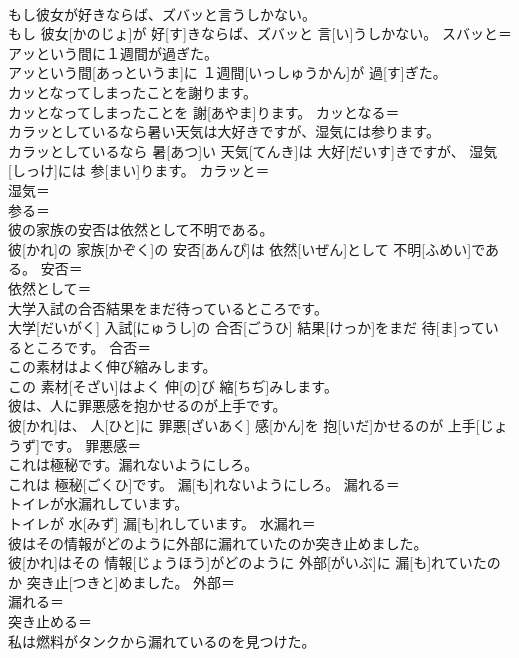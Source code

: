 \documentclass[8pt]{extreport}
\begin{document}
\begin{CJK}{UTF8}{min}
\\	もし彼女が好きならば、ズバッと言うしかない。	
\\	もし 彼女[かのじょ]が 好[す]きならば、ズバッと 言[い]うしかない。	スバッと＝ 
\\	アッという間に１週間が過ぎた。	
\\	アッという間[あっというま]に １週間[いっしゅうかん]が 過[す]ぎた。	
\\	カッとなってしまったことを謝ります。	
\\	カッとなってしまったことを 謝[あやま]ります。	カッとなる＝ 
\\	カラッとしているなら暑い天気は大好きですが、湿気には参ります。	
\\	カラッとしているなら 暑[あつ]い 天気[てんき]は 大好[だいす]きですが、 湿気[しっけ]には 参[まい]ります。	カラッと＝ 
\\	湿気＝ 
\\	参る＝ 
\\	彼の家族の安否は依然として不明である。	
\\	彼[かれ]の 家族[かぞく]の 安否[あんぴ]は 依然[いぜん]として 不明[ふめい]である。	安否＝ 
\\	依然として＝ 
\\	大学入試の合否結果をまだ待っているところです。	
\\	大学[だいがく] 入試[にゅうし]の 合否[ごうひ] 結果[けっか]をまだ 待[ま]っているところです。	合否＝ 
\\	この素材はよく伸び縮みします。	
\\	この 素材[そざい]はよく 伸[の]び 縮[ちぢ]みします。	
\\	彼は、人に罪悪感を抱かせるのが上手です。	
\\	彼[かれ]は、 人[ひと]に 罪悪[ざいあく] 感[かん]を 抱[いだ]かせるのが 上手[じょうず]です。	罪悪感＝ 
\\	これは極秘です。漏れないようにしろ。	
\\	これは 極秘[ごくひ]です。 漏[も]れないようにしろ。	漏れる＝ 
\\	トイレが水漏れしています。	
\\	トイレが 水[みず] 漏[も]れしています。	水漏れ＝ 
\\	彼はその情報がどのように外部に漏れていたのか突き止めました。	
\\	彼[かれ]はその 情報[じょうほう]がどのように 外部[がいぶ]に 漏[も]れていたのか 突き止[つきと]めました。	外部＝ 
\\	漏れる＝ 
\\	突き止める＝ 
\\	私は燃料がタンクから漏れているのを見つけた。	

\end{CJK}
\end{document}
